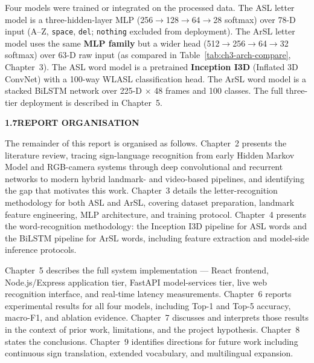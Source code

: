 \noindent Four models were trained or integrated on the processed data. The ASL letter model is a three-hidden-layer MLP (256$\rightarrow$128$\rightarrow$64$\rightarrow$28 softmax) over 78-D input (A--Z, \texttt{space}, \texttt{del}; \texttt{nothing} excluded from deployment). The ArSL letter model uses the same \textbf{MLP family} but a wider head (512$\rightarrow$256$\rightarrow$64$\rightarrow$32 softmax) over 63-D raw input (as compared in Table~\ref{tab:ch3-arch-compare}, Chapter~3). The ASL word model is a pretrained \textbf{Inception I3D} (Inflated 3D ConvNet) with a 100-way WLASL classification head. The ArSL word model is a stacked BiLSTM network over 225-D $\times$ 48 frames and 100 classes. The full three-tier deployment is described in Chapter~5.\par\vspace{0.6cm}

\secneed
\noindent\textbf{1.7\quad REPORT ORGANISATION}\par
{}
\vspace{0.4cm}

\noindent The remainder of this report is organised as follows. Chapter~2 presents the literature review, tracing sign-language recognition from early Hidden Markov Model and RGB-camera systems through deep convolutional and recurrent networks to modern hybrid landmark- and video-based pipelines, and identifying the gap that motivates this work. Chapter~3 details the letter-recognition methodology for both ASL and ArSL, covering dataset preparation, landmark feature engineering, MLP architecture, and training protocol. Chapter~4 presents the word-recognition methodology: the Inception I3D pipeline for ASL words and the BiLSTM pipeline for ArSL words, including feature extraction and model-side inference protocols.\par\vspace{0.3cm}

\subsecneed
\noindent Chapter~5 describes the full system implementation --- React frontend, Node.js/Express application tier, FastAPI model-services tier, live web recognition interface, and real-time latency measurements. Chapter~6 reports experimental results for all four models, including Top-1 and Top-5 accuracy, macro-F1, and ablation evidence. Chapter~7 discusses and interprets those results in the context of prior work, limitations, and the project hypothesis. Chapter~8 states the conclusions. Chapter~9 identifies directions for future work including continuous sign translation, extended vocabulary, and multilingual expansion.\par
